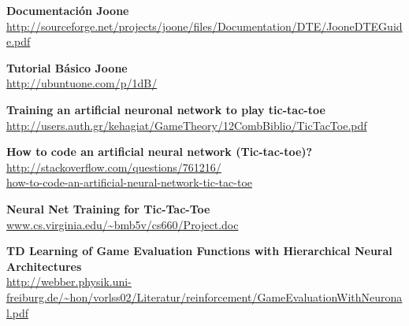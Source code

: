 \documentclass[12pt,titlepage]{article}
\begin{document}
\pagebreak
\begin{thebibliography}{99}
		\textbf{Documentaci\'on Joone} \\
		\url{http://sourceforge.net/projects/joone/files/Documentation/DTE/JooneDTEGuide.pdf}

		\textbf{Tutorial B\'asico Joone} \\
		\url{http://ubuntuone.com/p/1dB/}

		\textbf{Training an artificial neuronal network to play tic-tac-toe} \\
		\url{http://users.auth.gr/kehagiat/GameTheory/12CombBiblio/TicTacToe.pdf}

		\textbf{How to code an artificial neural network (Tic-tac-toe)?} \\
		\url{http://stackoverflow.com/questions/761216/} \\
		\url{how-to-code-an-artificial-neural-network-tic-tac-toe}

		\textbf{Neural Net Training for Tic-Tac-Toe} \\
		\url{www.cs.virginia.edu/~bmb5v/cs660/Project.doc}

		\textbf{TD Learning of Game Evaluation Functions with Hierarchical Neural Architectures} \\
		\url{http://webber.physik.uni-freiburg.de/~hon/vorlss02/Literatur/reinforcement/GameEvaluationWithNeuronal.pdf}

\end{thebibliography}


\end{document}
